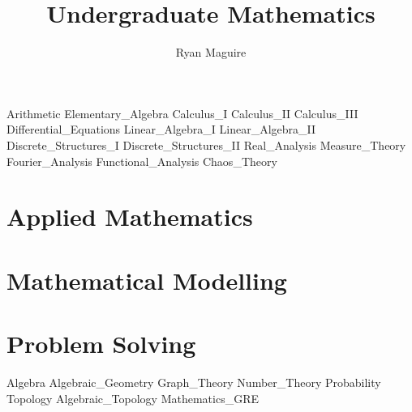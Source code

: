 \documentclass[crop=false,class=book,oneside]{standalone}
\begin{document}
    \newif\ifmathcourses
    \ifx\ifcourses\undefined
        \title{Undergraduate Mathematics}
        \author{Ryan Maguire}
        \date{\vspace{-5ex}}
        \maketitle
        \tableofcontents
        \listoffigures
        \listoftables
        \clearpage
    \fi
    {Arithmetic}
    {Elementary_Algebra}
    {Calculus_I}
    {Calculus_II}
    {Calculus_III}
    {Differential_Equations}
    {Linear_Algebra_I}
    {Linear_Algebra_II}
    {Discrete_Structures_I}
    {Discrete_Structures_II}
    {Real_Analysis}
    {Measure_Theory}
    {Fourier_Analysis}
    {Functional_Analysis}
    {Chaos_Theory}
    \chapter{Applied Mathematics}
    \chapter{Mathematical Modelling}
    \chapter{Problem Solving}
    {Algebra}
    {Algebraic_Geometry}
    {Graph_Theory}
    {Number_Theory}
    {Probability}
    {Topology}
    {Algebraic_Topology}
    {Mathematics_GRE}
\end{document}
